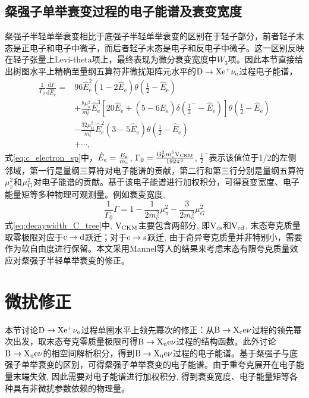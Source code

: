 \subsection{粲强子单举衰变过程的电子能谱及衰变宽度}
粲强子半轻单举衰变相比于底强子半轻单举衰变的区别在于轻子部分，前者轻子末态是正电子和电子中微子，而后者轻子末态是电子和反电子中微子。这一区别反映在轻子张量上Levi-theta项上，最终表现为微分衰变宽度中$W_{3}$项。因此本节直接给出树图水平上精确至量纲五算符非微扰矩阵元水平的$\mathrm{D\to X e^{+}\nu_{e}}$过程电子能谱，
\begin{equation}
    \begin{aligned}
        \frac{1}{\Gamma_{0}} \frac{\mathrm{d} \Gamma}{\mathrm{d} \hat{E}_{\mathrm{e}}} = & 96 \hat{E}_{\mathrm{e}}^2 (1 - 2 \hat{E}_{\mathrm{e}}) \theta\left( \frac{1}{2} - \hat{E}_{\mathrm{e}} \right) \\
        & + \frac{8 \mu_{\pi}^2}{m_{\mathrm{c}}^2} \hat{E}_{\mathrm{e}}^3 \left[ 20 \hat{E}_{\mathrm{e}} + (5 - 6 \hat{E}_{\mathrm{e}}) \delta \left( \frac{1}{2}^{-} - \hat{E}_{\mathrm{e}} \right) \right] \theta\left( \frac{1}{2} - \hat{E}_{\mathrm{e}} \right) \\
        & - \frac{32 \mu_{\mathrm{G}}^2}{m_{\mathrm{c}}^2} \hat{E}_{\mathrm{e}}^2 (3 - 5 \hat{E}_{\mathrm{e}}) \theta\left( \frac{1}{2} - \hat{E}_{\mathrm{e}} \right) \\
        & + \cdots,
    \end{aligned}
    \label{eq:c_electron_sp}
\end{equation}
式\eqref{eq:c_electron_sp}中，$\hat{E}_{e}=\frac{E_{\mathrm{e}}}{m_{\mathrm{c}}}$, $\Gamma_{0}=\frac{\mathrm{G_F^2} m_{\mathrm{c}}^5 \mathrm{V}_{\text{CKM}}}{192\pi^3}$, $\frac{1}{2}^{-}$表示该值位于1/2的左侧邻域，第一行是量纲三算符对电子能谱的贡献，第二行和第三行分别是量纲五算符$\mu_{\pi}^{2}$和$\mu_{\mathrm{G}}^{2}$对电子能谱的贡献。基于该电子能谱进行加权积分，可得衰变宽度、电子能量矩等多种物理可观测量。例如衰变宽度,
\begin{equation}
    \frac{1}{\Gamma_{0}}\Gamma=1-\frac{1}{2 m_{c}^2}\mu_{\pi}^{2}-\frac{3}{2 m_{c}^2}\mu_{G}^{2}
    \label{eq:decaywidth_C_tree}
\end{equation}
式\eqref{eq:decaywidth_C_tree}中, $\mathrm{V_{\text{CKM}}}$主要包含两部分, 即$\mathrm{V_{\text{cs}}}$和$\mathrm{V_{\text{cd}}}$, 末态夸克质量取零极限对应于$\mathrm{c\to d}$跃迁；对于$\mathrm{c\to s}$跃迁, 由于奇异夸克质量并非特别小，需要作为软自由度进行保留。本文采用Mannel等人的结果来考虑末态有限夸克质量效应对粲强子半轻单举衰变的修正。
\section{微扰修正}
本节讨论$\mathrm{D\to X e^{+}\nu_{e}}$过程单圈水平上领先幂次的修正：从$\mathrm{B\to X_{\text{c}}e\nu}$过程的领先幂次出发，取末态夸克零质量极限可得$\mathrm{B\to X_{\text{u}}e\nu}$过程的结构函数。此外讨论$\mathrm{B\to X_{\text{u}}e\nu}$的相空间解析积分，得到$\mathrm{B\to X_{\text{u}}e\nu}$过程的电子能谱。基于粲强子与底强子单举衰变的区别，可得粲强子单举衰变的电子能谱。由于重夸克展开在电子能量末端失效, 因此需要对电子能谱进行加权积分, 得到衰变宽度、电子能量矩等各种具有非微扰参数依赖的物理量。

